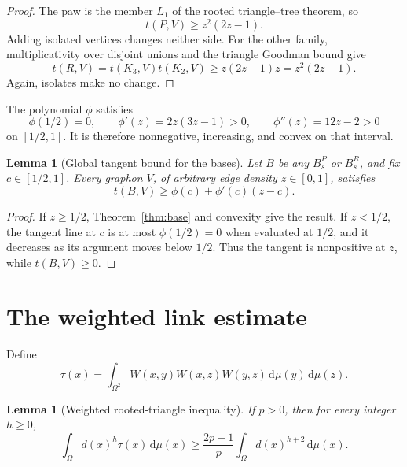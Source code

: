 \documentclass[11pt]{article}
\newtheorem{lemma}[theorem]{Lemma}
\newcommand{\dd}{\,\mathrm{d}}
\begin{document}
\begin{proof}
The paw is the member $L_1$ of the rooted triangle--tree theorem, so
\[
t(P,V)\geq z^2(2z-1).
\]
Adding isolated vertices changes neither side.  For the other family,
multiplicativity over disjoint unions and the triangle Goodman bound
give
\[
t(R,V)=t(K_3,V)t(K_2,V)
\geq z(2z-1)z=z^2(2z-1).
\]
Again, isolates make no change.
\end{proof}

The polynomial $\phi$ satisfies
\[
\phi(1/2)=0,
\qquad
\phi'(z)=2z(3z-1)>0,
\qquad
\phi''(z)=12z-2>0
\]
on $[1/2,1]$.  It is therefore nonnegative, increasing, and convex on
that interval.

\begin{lemma}[Global tangent bound for the bases]
\label{lem:tangent}
Let $B$ be any $B_s^P$ or $B_s^R$, and fix $c\in[1/2,1]$.  Every
graphon $V$, of arbitrary edge density $z\in[0,1]$, satisfies
\[
t(B,V)\geq\phi(c)+\phi'(c)(z-c).
\]
\end{lemma}

\begin{proof}
If $z\geq1/2$, Theorem~\ref{thm:base} and convexity give the result.
If $z<1/2$, the tangent line at $c$ is at most
$\phi(1/2)=0$ when evaluated at $1/2$, and it decreases as its argument
moves below $1/2$.  Thus the tangent is nonpositive at $z$, while
$t(B,V)\geq0$.
\end{proof}


\section{The weighted link estimate}

Define
\[
\tau(x)=
\int_{\Omega^2}W(x,y)W(x,z)W(y,z)
\dd\mu(y)\dd\mu(z).
\]

\begin{lemma}[Weighted rooted-triangle inequality]
\label{lem:weighted}
If $p>0$, then for every integer $h\geq0$,
\[
\int_\Omega d(x)^h\tau(x)\dd\mu(x)
\geq
\frac{2p-1}{p}
\int_\Omega d(x)^{h+2}\dd\mu(x).
\]
\end{lemma}
\end{document}

